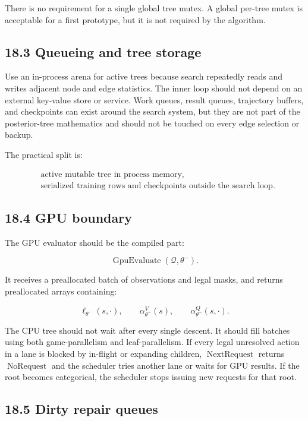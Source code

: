 \documentclass[11pt]{article}
\newcommand{\NextRequest}{\operatorname{NextRequest}}
\newcommand{\GpuEvaluate}{\operatorname{GpuEvaluate}}
\newcommand{\NoRequest}{\operatorname{NoRequest}}
\begin{document}
There is no requirement for a single global tree mutex. A global per-tree mutex
is acceptable for a first prototype, but it is not required by the algorithm.

\subsection*{18.3 Queueing and tree storage}

Use an in-process arena for active trees because search repeatedly reads and
writes adjacent node and edge statistics. The inner loop should not depend on an
external key-value store or service. Work queues, result queues, trajectory
buffers, and checkpoints can exist around the search system, but they are not
part of the posterior-tree mathematics and should not be touched on every edge
selection or backup.

The practical split is:

\[
\begin{aligned}
&\text{active mutable tree in process memory},\\
&\text{serialized training rows and checkpoints outside the search loop}.
\end{aligned}
\]

\subsection*{18.4 GPU boundary}

The GPU evaluator should be the compiled part:

\[
\GpuEvaluate(\mathcal{Q},\theta^-).
\]

It receives a preallocated batch of observations and legal masks, and returns
preallocated arrays containing:

\[
\ell_{\theta^-}(s,\cdot),
\qquad
\alpha_{\theta^-}^V(s),
\qquad
\alpha_{\theta^-}^Q(s,\cdot).
\]

The CPU tree should not wait after every single descent. It should fill batches
using both game-parallelism and leaf-parallelism. If every legal unresolved
action in a lane is blocked by in-flight or expanding children,
\(\NextRequest\) returns \(\NoRequest\) and the scheduler tries another lane or
waits for GPU results. If the root becomes categorical, the scheduler stops
issuing new requests for that root.

\subsection*{18.5 Dirty repair queues}
\end{document}
